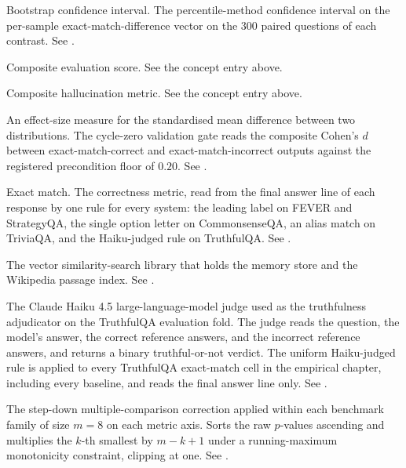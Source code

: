 \begin{description}[style=nextline, leftmargin=0pt, labelindent=0pt, itemsep=6pt, parsep=0pt, font=\bfseries, beginpenalty=10000]

\item[Bootstrap CI:] Bootstrap confidence interval. The percentile-method confidence interval on the per-sample exact-match-difference vector on the $300$ paired questions of each contrast. See .

\item[CES:] Composite evaluation score. See the concept entry above.

\item[CHM:] Composite hallucination metric. See the concept entry above.

\item[Cohen's $d$:] An effect-size measure for the standardised mean difference between two distributions. The cycle-zero validation gate reads the composite Cohen's $d$ between exact-match-correct and exact-match-incorrect outputs against the registered precondition floor of $0.20$. See .

\item[EM:] Exact match. The correctness metric, read from the final answer line of each response by one rule for every system: the leading label on FEVER and StrategyQA, the single option letter on CommonsenseQA, an alias match on TriviaQA, and the Haiku-judged rule on TruthfulQA. See .

\item[FAISS:] The vector similarity-search library that holds the memory store and the Wikipedia passage index. See .

\item[Haiku-judged:]\nopagebreak[4] The Claude Haiku 4.5 large-language-model judge used as the truthfulness adjudicator on the TruthfulQA evaluation fold. The judge reads the question, the model's answer, the correct reference answers, and the incorrect reference answers, and returns a binary truthful-or-not verdict. The uniform Haiku-judged rule is applied to every TruthfulQA exact-match cell in the empirical chapter, including every baseline, and reads the final answer line only. See .

\item[Holm-Bonferroni:] The step-down multiple-comparison correction applied within each benchmark family of size $m = 8$ on each metric axis. Sorts the raw $p$-values ascending and multiplies the $k$-th smallest by $m - k + 1$ under a running-maximum monotonicity constraint, clipping at one. See .


\end{description}
